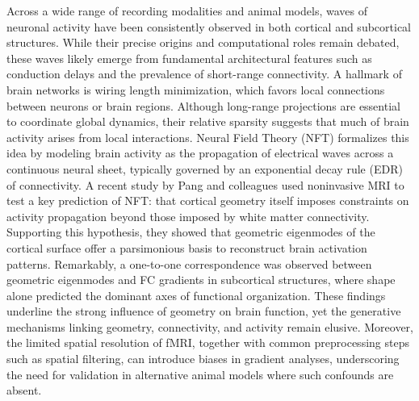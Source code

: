 \documentclass{article}
\begin{document}
Across a wide range of recording modalities and animal models, waves of neuronal activity have been consistently observed in both cortical and subcortical structures\cite{raut2021global, ye2023brain, matsui2016transient, xu2023interacting}. While their precise origins and computational roles remain debated, these waves likely emerge from fundamental architectural features such as conduction delays and the prevalence of short-range connectivity\cite{muller2018cortical}. A hallmark of brain networks is wiring length minimization, which favors local connections between neurons or brain regions\cite{bullmore2012economy}. Although long-range projections are essential to coordinate global dynamics\cite{o2013causal, betzel2018specificity, vohryzek2025human}, their relative sparsity suggests that much of brain activity arises from local interactions. Neural Field Theory (NFT) formalizes this idea by modeling brain activity as the propagation of electrical waves across a continuous neural sheet\cite{robinson1997propagation, robinson2016eigenmodes, gabay2018dynamics}, typically governed by an exponential decay rule (EDR) of connectivity\cite{ercsey2013predictive}. A recent study by Pang and colleagues\cite{pang2023geometric} used noninvasive MRI to test a key prediction of NFT: that cortical geometry itself imposes constraints on activity propagation beyond those imposed by white matter connectivity. Supporting this hypothesis, they showed that geometric eigenmodes of the cortical surface offer a parsimonious basis to reconstruct brain activation patterns\cite{pang2023geometric}. Remarkably, a one-to-one correspondence was observed between geometric eigenmodes and FC gradients in subcortical structures, where shape alone predicted the dominant axes of functional organization\cite{pang2023geometric}. These findings underline the strong influence of geometry on brain function, yet the generative mechanisms linking geometry, connectivity, and activity remain elusive. Moreover, the limited spatial resolution of fMRI, together with common preprocessing steps such as spatial filtering, can introduce biases in gradient analyses\cite{watson2023connectopic}, underscoring the need for validation in alternative animal models where such confounds are absent.
\end{document}
